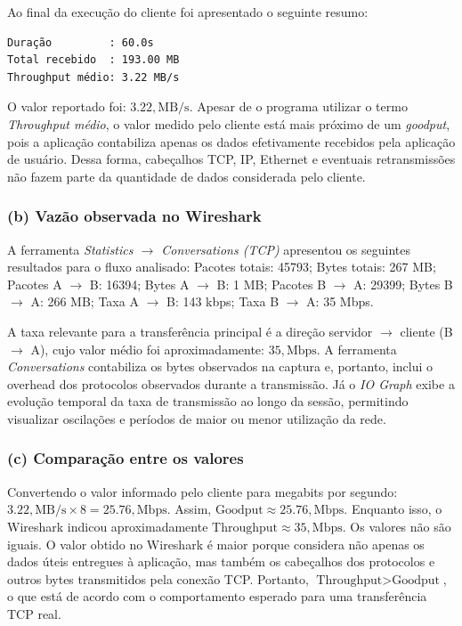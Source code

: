 \documentclass[
    12pt,
    a4paper,
    oneside
]{article}
\begin{document}
Ao final da execução do cliente foi apresentado o seguinte resumo:

\begin{verbatim}
Duração         : 60.0s
Total recebido  : 193.00 MB
Throughput médio: 3.22 MB/s
\end{verbatim}

O valor reportado foi: $3.22,\text{MB/s}$. Apesar de o programa utilizar o termo \textit{Throughput médio}, o valor medido pelo cliente está mais próximo de um \textit{goodput}, pois a aplicação contabiliza apenas os dados efetivamente recebidos pela aplicação de usuário. Dessa forma, cabeçalhos TCP, IP, Ethernet e eventuais retransmissões não fazem parte da quantidade de dados considerada pelo cliente.

\subsubsection*{(b) Vazão observada no Wireshark}

A ferramenta \textit{Statistics $\rightarrow$ Conversations (TCP)} apresentou os seguintes resultados para o fluxo analisado: Pacotes totais: 45793; Bytes totais: 267 MB; Pacotes A $\rightarrow$ B: 16394; Bytes A $\rightarrow$ B: 1 MB; Pacotes B $\rightarrow$ A: 29399; Bytes B $\rightarrow$ A: 266 MB; Taxa A $\rightarrow$ B: 143 kbps; Taxa B $\rightarrow$ A: 35 Mbps.

A taxa relevante para a transferência principal é a direção servidor $\rightarrow$ cliente (B $\rightarrow$ A), cujo valor médio foi aproximadamente: $35,\text{Mbps}$. A ferramenta \textit{Conversations} contabiliza os bytes observados na captura e, portanto, inclui o overhead dos protocolos observados durante a transmissão. Já o \textit{IO Graph} exibe a evolução temporal da taxa de transmissão ao longo da sessão, permitindo visualizar oscilações e períodos de maior ou menor utilização da rede.

\subsubsection*{(c) Comparação entre os valores}

Convertendo o valor informado pelo cliente para megabits por segundo: $3.22,\text{MB/s}\times8=25.76,\text{Mbps}$. Assim, $\text{Goodput}\approx25.76,\text{Mbps}$. Enquanto isso, o Wireshark indicou aproximadamente $\text{Throughput}\approx35,\text{Mbps}$. Os valores não são iguais. O valor obtido no Wireshark é maior porque considera não apenas os dados úteis entregues à aplicação, mas também os cabeçalhos dos protocolos e outros bytes transmitidos pela conexão TCP. Portanto, $\text{Throughput}>\text{Goodput}$, o que está de acordo com o comportamento esperado para uma transferência TCP real.
\end{document}
